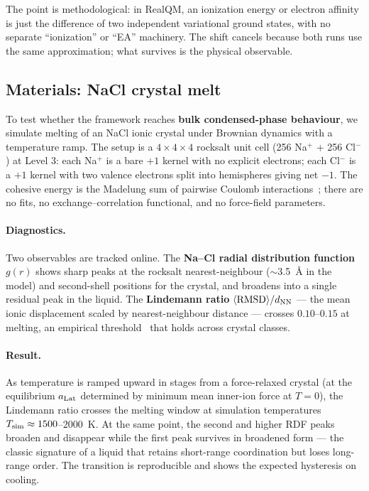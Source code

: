 \documentclass[11pt]{article}
\begin{document}
The point is methodological: in RealQM, an ionization energy or electron affinity is just the difference of two independent variational ground states, with no separate ``ionization'' or ``EA'' machinery. The shift cancels because both runs use the same approximation; what survives is the physical observable.

\subsection{Materials: NaCl crystal melt}\label{sec:nacl}

To test whether the framework reaches \textbf{bulk condensed-phase behaviour}, we simulate melting of an NaCl ionic crystal under Brownian dynamics with a temperature ramp. The setup is a $4 \times 4 \times 4$ rocksalt unit cell (256 Na$^+$ + 256 Cl$^-$) at Level 3: each Na$^+$ is a bare $+1$ kernel with no explicit electrons; each Cl$^-$ is a $+1$ kernel with two valence electrons split into hemispheres giving net $-1$. The cohesive energy is the Madelung sum of pairwise Coulomb interactions~\cite{BornMayer32}; there are no fits, no exchange--correlation functional, and no force-field parameters.

\paragraph{Diagnostics.}
Two observables are tracked online. The \textbf{Na--Cl radial distribution function} $g(r)$ shows sharp peaks at the rocksalt nearest-neighbour ($\sim$3.5~\AA{} in the model) and second-shell positions for the crystal, and broadens into a single residual peak in the liquid. The \textbf{Lindemann ratio} $\langle\mathrm{RMSD}\rangle / d_{\rm NN}$ --- the mean ionic displacement scaled by nearest-neighbour distance --- crosses $0.10$--$0.15$ at melting, an empirical threshold~\cite{Lindemann10} that holds across crystal classes.

\paragraph{Result.}
As temperature is ramped upward in stages from a force-relaxed crystal (at the equilibrium $a_{\rm Lat}$ determined by minimum mean inner-ion force at $T = 0$), the Lindemann ratio crosses the melting window at simulation temperatures $T_{\rm sim} \approx 1500$--$2000$~K. At the same point, the second and higher RDF peaks broaden and disappear while the first peak survives in broadened form --- the classic signature of a liquid that retains short-range coordination but loses long-range order. The transition is reproducible and shows the expected hysteresis on cooling.
\end{document}
